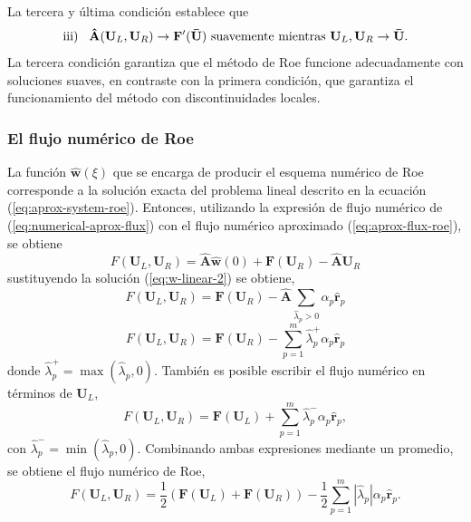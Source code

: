 La tercera y última condición establece que
\begin{equation}
	\text{iii)}\hspace{3mm} \mathbf{\hat{A}}(\mathbf{U}_L, \mathbf{U}_R) \rightarrow \mathbf{F}'(\mathbf{\bar{U}}) \text{ suavemente mientras } \mathbf{{U}}_L, \mathbf{{U}}_R \rightarrow \mathbf{\bar{U}}.
	\label{eq:tercera-cond-roe}
\end{equation}
La tercera condición garantiza que el método de Roe funcione adecuadamente con soluciones suaves, en contraste con la primera condición, que garantiza el funcionamiento del método con discontinuidades locales. 
\subsubsection{El flujo numérico de Roe}
La función $\mathbf{\hat{w}}(\xi)$ que se encarga de producir el esquema numérico de Roe corresponde a la solución exacta del problema lineal descrito en la ecuación (\ref{eq:aprox-system-roe}). Entonces, utilizando la expresión de flujo numérico de (\ref{eq:numerical-aprox-flux}) con el flujo numérico aproximado (\ref{eq:aprox-flux-roe}), se obtiene
\begin{equation}
	F(\mathbf{U}_L, \mathbf{U}_R) = \mathbf{\hat{A}}{\mathbf{\hat{w}}}(0) +  \mathbf{F}(\mathbf{U}_R)-\mathbf{\hat{A}}\mathbf{U}_R
\end{equation}
sustituyendo la solución (\ref{eq:w-linear-2}) se obtiene,
\begin{equation}
	F(\mathbf{U}_L, \mathbf{U}_R) = \mathbf{F}(\mathbf{U}_R) - \mathbf{\hat{A}}\sum_{\hat{\lambda}_p > 0}\alpha_{p} \mathbf{\hat{r}}_{p}
\end{equation}
\begin{equation}
	F(\mathbf{U}_L, \mathbf{U}_R) = \mathbf{F}(\mathbf{U}_R) - \sum_{p=1}^{m} \hat{\lambda}_{p}^{+}\alpha_{p}\mathbf{\hat{r}}_{p}
\end{equation}
donde $\hat{\lambda}_{p}^{+} = \max{(\hat{\lambda}_{p},0)}$. También es posible escribir el flujo numérico en términos de $\mathbf{U}_L$,
\begin{equation}
	F(\mathbf{U}_L, \mathbf{U}_R) = \mathbf{F}(\mathbf{U}_L) + \sum_{p=1}^{m} \hat{\lambda}_{p}^{-}\alpha_{p}\mathbf{\hat{r}}_{p},
\end{equation}
con $\hat{\lambda}_{p}^{-} = \min{(\hat{\lambda}_{p},0)}$. Combinando ambas expresiones mediante un promedio, se obtiene el flujo numérico de Roe,
\begin{equation}
	F(\mathbf{U}_L, \mathbf{U}_R) = \frac{1}{2}\left(\mathbf{F}(\mathbf{U}_L) +\mathbf{F}(\mathbf{U}_R)\right) - 
	\frac{1}{2}\sum_{p=1}^{m}|\hat{\lambda}_{p}|\alpha_{p}\mathbf{\hat{r}}_{p}.
	\label{eq:roe-flux}
\end{equation}
